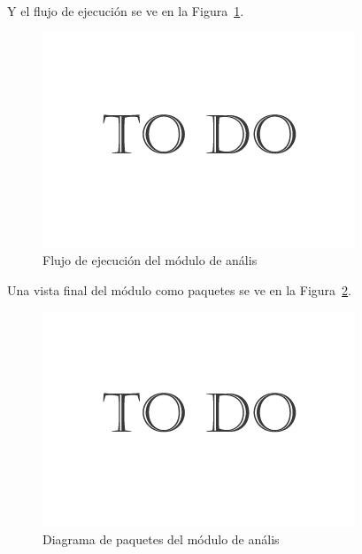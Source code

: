 Y el flujo de ejecución se ve en la Figura~\ref{fig:diagramaflujoPHIC}.\\

		\begin{figure}[htbp]
		\centering
		\includegraphics[scale=0.47]{graphics/todo.png}
		\caption{Flujo de ejecución del módulo de anális}
		\label{fig:diagramaflujoPHIC}
		\end{figure}
		
Una vista final del módulo como paquetes se ve en la Figura~\ref{fig:diagramapaquetesPHIC}.\\

		\begin{figure}[htbp]
		\centering
		\includegraphics[scale=0.47]{graphics/todo.png}
		\caption{Diagrama de paquetes del módulo de anális}
		\label{fig:diagramapaquetesPHIC}
		\end{figure}
